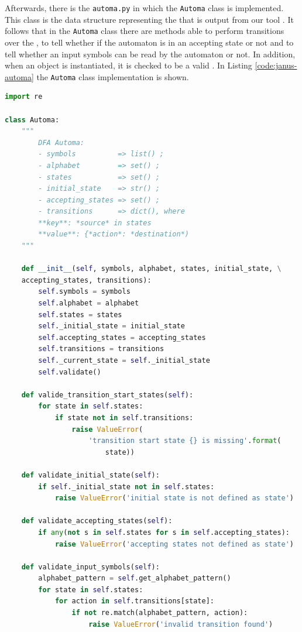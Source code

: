 Afterwards, there is the \texttt{automa.py} in which the \texttt{Automa} class is implemented. This class is the data structure representing the \DFA that is output from our tool \LTLfToDFA. It follows that in the \texttt{Automa} class there are methods able to perform transitions over the \DFA, to tell whether if the automaton is in an accepting state or not and to tell whether an input symbols can be read by the automaton or not. In addition, when an object is instantiated, it is checked to be a valid \DFA. In Listing \ref{code:janus-automa} the \texttt{Automa} class implementation is shown.
\begin{lstlisting}[language=Python, style=Python, escapechar = £, label={code:janus-automa}, caption={The \texttt{automa.py} module}]
import re

class Automa:
    """
        DFA Automa:
        - symbols          => list() ;
        - alphabet         => set() ;
        - states           => set() ;
        - initial_state    => str() ;
        - accepting_states => set() ;
        - transitions      => dict(), where
        **key**: *source* in states
        **value**: {*action*: *destination*)
    """

    def __init__(self, symbols, alphabet, states, initial_state, \
    accepting_states, transitions):
        self.symbols = symbols
        self.alphabet = alphabet
        self.states = states
        self._initial_state = initial_state
        self.accepting_states = accepting_states
        self.transitions = transitions
        self._current_state = self._initial_state
        self.validate()

    def valide_transition_start_states(self):
        for state in self.states:
            if state not in self.transitions:
                raise ValueError(
                    'transition start state {} is missing'.format(
                        state))

    def validate_initial_state(self):
        if self._initial_state not in self.states:
            raise ValueError('initial state is not defined as state')

    def validate_accepting_states(self):
        if any(not s in self.states for s in self.accepting_states):
            raise ValueError('accepting states not defined as state')

    def validate_input_symbols(self):
        alphabet_pattern = self.get_alphabet_pattern()
        for state in self.states:
            for action in self.transitions[state]:
                if not re.match(alphabet_pattern, action):
                    raise ValueError('invalid transition found')


\end{lstlisting}
